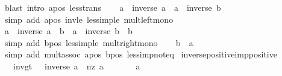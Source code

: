 \begin{isabellebody}
\ {\isacharparenleft}{\kern0pt}blast\ intro{\isacharcolon}{\kern0pt}\ apos\ less{\isacharunderscore}{\kern0pt}trans{\isacharparenright}{\kern0pt}\isanewline
\ \ \isamarkupfalse%
\ {\isachardoublequoteopen}a\ {\isacharasterisk}{\kern0pt}\ inverse\ a\ {\isasymle}\ a\ {\isacharasterisk}{\kern0pt}\ inverse\ b{\isachardoublequoteclose}\isanewline
\ \ \ \ \isamarkupfalse%
\ {\isacharparenleft}{\kern0pt}simp\ add{\isacharcolon}{\kern0pt}\ apos\ invle\ less{\isacharunderscore}{\kern0pt}imp{\isacharunderscore}{\kern0pt}le\ mult{\isacharunderscore}{\kern0pt}left{\isacharunderscore}{\kern0pt}mono{\isacharparenright}{\kern0pt}\isanewline
\ \ \isamarkupfalse%
\ {\isachardoublequoteopen}{\isacharparenleft}{\kern0pt}a\ {\isacharasterisk}{\kern0pt}\ inverse\ a{\isacharparenright}{\kern0pt}\ {\isacharasterisk}{\kern0pt}\ b\ {\isasymle}\ {\isacharparenleft}{\kern0pt}a\ {\isacharasterisk}{\kern0pt}\ inverse\ b{\isacharparenright}{\kern0pt}\ {\isacharasterisk}{\kern0pt}\ b{\isachardoublequoteclose}\isanewline
\ \ \ \ \isamarkupfalse%
\ {\isacharparenleft}{\kern0pt}simp\ add{\isacharcolon}{\kern0pt}\ bpos\ less{\isacharunderscore}{\kern0pt}imp{\isacharunderscore}{\kern0pt}le\ mult{\isacharunderscore}{\kern0pt}right{\isacharunderscore}{\kern0pt}mono{\isacharparenright}{\kern0pt}\isanewline
\ \ \isamarkupfalse%
\ {\isachardoublequoteopen}b\ {\isasymle}\ a{\isachardoublequoteclose}\ \ \isamarkupfalse%
\ {\isacharparenleft}{\kern0pt}simp\ add{\isacharcolon}{\kern0pt}\ mult{\isachardot}{\kern0pt}assoc\ apos\ bpos\ less{\isacharunderscore}{\kern0pt}imp{\isacharunderscore}{\kern0pt}not{\isacharunderscore}{\kern0pt}eq{}{\isacharparenright}{\kern0pt}\isanewline
{}\isamarkupfalse%
%
\endisatagproof
{\isafoldproof}%
%
\isadelimproof
\isanewline
%
\endisadelimproof
\isanewline
{}\isamarkupfalse%
\ inverse{\isacharunderscore}{\kern0pt}positive{\isacharunderscore}{\kern0pt}imp{\isacharunderscore}{\kern0pt}positive{\isacharcolon}{\kern0pt}\isanewline
\ \ \ inv{\isacharunderscore}{\kern0pt}gt{\isacharunderscore}{\kern0pt}{}{\isacharcolon}{\kern0pt}\ {\isachardoublequoteopen}{}\ {\isacharless}{\kern0pt}\ inverse\ a{\isachardoublequoteclose}\ \ nz{\isacharcolon}{\kern0pt}\ {\isachardoublequoteopen}a\ {\isasymnoteq}\ {}{\isachardoublequoteclose}\isanewline
\ \ \ {\isachardoublequoteopen}{}\ {\isacharless}{\kern0pt}\ a{\isachardoublequoteclose}\isanewline
%

\end{isabellebody}
